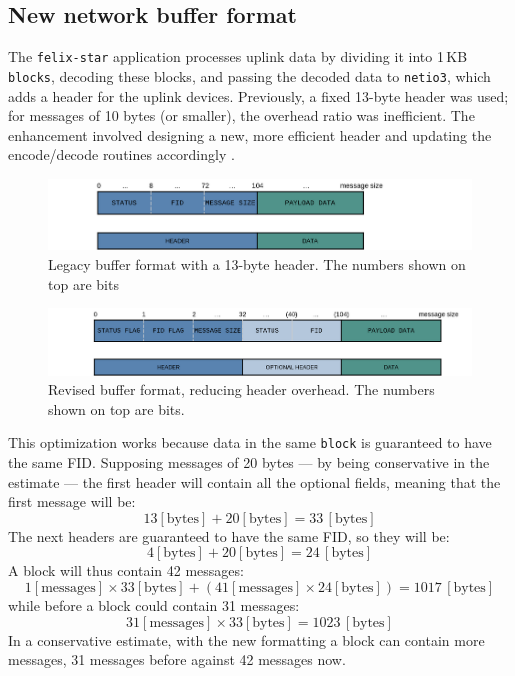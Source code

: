 \subsection{New network buffer format}

The \texttt{felix-star} application processes uplink data by dividing it into 1\,KB \texttt{blocks}, decoding these blocks, and passing the decoded data to \texttt{netio3}, which adds a header for the uplink devices. 
Previously, a fixed 13-byte header was used; for messages of 10 bytes (or smaller), the overhead ratio was inefficient.
The enhancement involved designing a new, more efficient header and updating the encode/decode routines accordingly \cite{netio3-header-commit}.\\

\begin{figure}[htbp]
\centering
\includegraphics[width=\textwidth]{images/contributions/old-buffer-format.png}
\caption[Legacy format of network buffer]{Legacy buffer format with a 13-byte header. The numbers shown on top are bits}
\label{fig:old-buffer-format}
\end{figure}

\begin{figure}[htbp]
\centering
\includegraphics[width=\textwidth]{images/contributions/new-buffer-format.png}
\caption[New network buffer format]{Revised buffer format, reducing header overhead. The numbers shown on top are bits.}
\label{fig:new-buffer-format}
\end{figure}

This optimization works because data in the same \texttt{block} is guaranteed to have the same \acs{FID}.
Supposing messages of 20 bytes --- by being conservative in the estimate --- the first header will contain all the optional fields, meaning that the first message will be:
\[
13 [\text{bytes}] + 20 [\text{bytes}] = 33 \, [\text{bytes}]
\]
The next headers are guaranteed to have the same \acs{FID}, so they will be:
\[
4 [\text{bytes}] + 20 [\text{bytes}] = 24\, [\text{bytes}]
\]
A block will thus contain 42 messages:
\[
1 [\text{messages}] \times 33 [\text{bytes}] + (41 [\text{messages}] \times 24 [\text{bytes}]) = 1017 \, [\text{bytes}]
\]
while before a block could contain 31 messages:
\[
31 [\text{messages}] \times 33 [\text{bytes}] = 1023\, [\text{bytes}]
\]
In a conservative estimate, with the new formatting a block can contain  more messages, 31 messages before against 42 messages now.